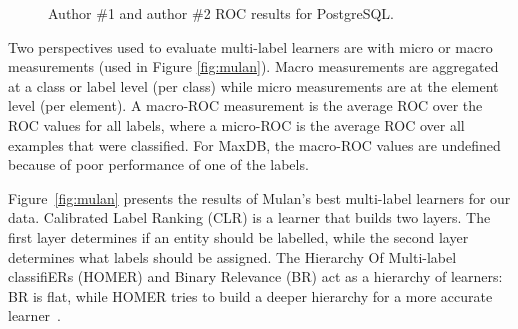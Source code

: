 \documentclass[smallextended]{svjour3}       %
\begin{document}
\begin{figure}
\centering
{}
\caption{Author \#1 and author \#2 ROC results for PostgreSQL.} 
\label{fig:pgcomp}
\end{figure}

Two perspectives used to evaluate multi-label learners are with micro or macro measurements (used in Figure \ref{fig:mulan}).
Macro measurements are aggregated at a class or label level (per class) while micro measurements are at the element level (per element).
A macro-ROC measurement is the average ROC over the ROC values for all labels, where a micro-ROC is the average ROC over all examples that were classified. 
For MaxDB, the macro-ROC values are undefined because of poor performance of one of the labels.%

Figure~\ref{fig:mulan} presents the results of Mulan's best multi-label learners for our data. 
Calibrated Label Ranking (CLR) is a learner that builds two layers. The first layer determines if an entity should be labelled, while the second layer
determines what labels should be assigned.
The Hierarchy Of Multi-label classifiERs (HOMER) and Binary Relevance (BR) act as a hierarchy of learners: BR is flat, while HOMER tries to build a
deeper hierarchy for a more accurate learner~\cite{mulan}. 
\end{document}
